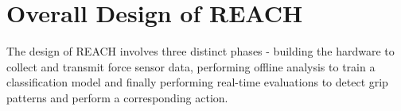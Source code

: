 \section{Overall Design of REACH}
The design of REACH involves three distinct phases - building the hardware to collect and transmit force sensor data, performing offline analysis to train a classification model and finally performing real-time evaluations to detect grip patterns and perform a corresponding action. 
